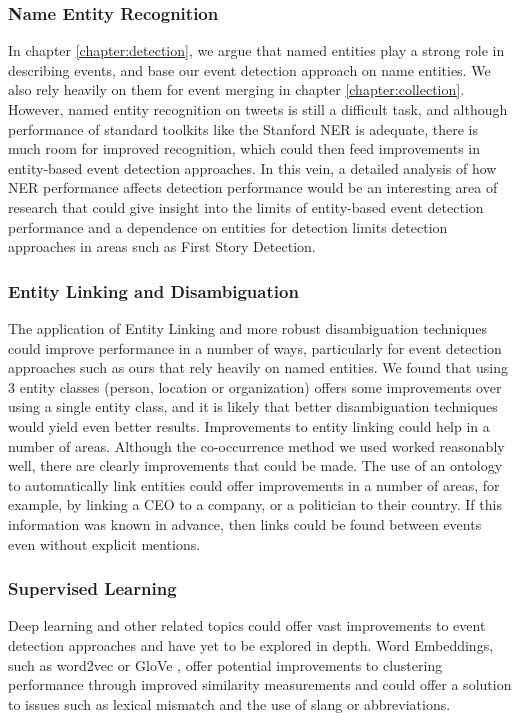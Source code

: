 \subsubsection{Name Entity Recognition}
In chapter \ref{chapter:detection}, we argue that named entities play a strong role in describing events, and base our event detection approach on name entities.
We also rely heavily on them for event merging in chapter \ref{chapter:collection}.
However, named entity recognition on tweets is still a difficult task, and although performance of standard toolkits like the Stanford NER is adequate, there is much room for improved recognition, which could then feed improvements
in entity-based event detection approaches.
In this vein, a detailed analysis of how NER performance affects detection performance would be an interesting area of research that could give insight into the limits of entity-based event detection performance and a dependence on entities for detection limits detection approaches in areas such as First Story Detection.

\subsubsection{Entity Linking and Disambiguation}
The application of Entity Linking and more robust disambiguation techniques could improve performance in a number of ways, particularly for event detection approaches such as ours that rely heavily on named entities.
We found that using 3 entity classes (person, location or organization) offers some improvements over using a single entity class, and it is likely that better disambiguation techniques would yield even better results.
Improvements to entity linking could help in a number of areas.
Although the co-occurrence method we used worked reasonably well, there are clearly improvements that could be made.
The use of an ontology to automatically link entities could offer improvements in a number of areas, for example, by linking a CEO to a company, or a politician to their country.
If this information was known in advance, then links could be found between events even without explicit mentions.

\subsubsection{Supervised Learning}
Deep learning and other related topics could offer vast improvements to event detection approaches and have yet to be explored in depth.
Word Embeddings, such as word2vec \citep{mikolov2013distributed} or GloVe \citep{pennington2014glove}, offer potential improvements  to clustering performance through improved similarity measurements and could offer a solution to issues such as lexical mismatch and the use of slang or abbreviations.

